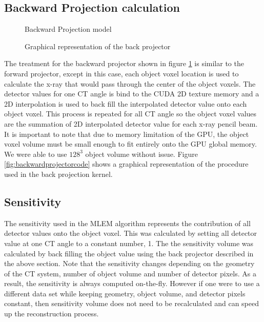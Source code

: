\subsection{Backward Projection calculation}

\begin{figure}[ht]
\centering
{}
\label{fig:backwardprojector}
\caption{Backward Projection model}
\end{figure}

\begin{figure}[ht]
\centering
{}
\label{fig:backprojectorcode}
\caption{Graphical representation of the back projector}
\end{figure}

The treatment for the backward projector shown in figure \ref{fig:backwardprojector} is similar to the forward projector, except in this case, each object voxel location is used to calculate the x-ray that would pass through the center of the object voxels.  The detector values for one CT angle is bind to the CUDA 2D texture memory and a 2D interpolation is used to back fill the interpolated detector value onto each object voxel.  This process is repeated for all CT angle so the object voxel values are the summation of 2D interpolated detector value for each x-ray pencil beam.  It is important to note that due to memory limitation of the GPU, the object voxel volume must be small enough to fit entirely onto the GPU global memory.  We were able to use $128^3$ object volume without issue.  Figure \ref{fig:backwardprojectorcode} shows a graphical representation of the procedure used in the back projection kernel.


\subsection{Sensitivity}
The sensitivity used in the MLEM algorithm represents the contribution of all detector values onto the object voxel.  This was calculated by setting all detector value at one CT angle to a constant number, 1.  The the sensitivity volume was calculated by back filling the object value using the back projector described in the above section.  Note that the sensitivity changes depending on the geometry of the CT system, number of object volume and number of detector pixels.  As a result, the sensitivity is always computed on-the-fly.  However if one were to use a different data set while keeping geometry, object volume, and detector pixels constant, then sensitivity volume does not need to be recalculated and can speed up the reconstruction process.

